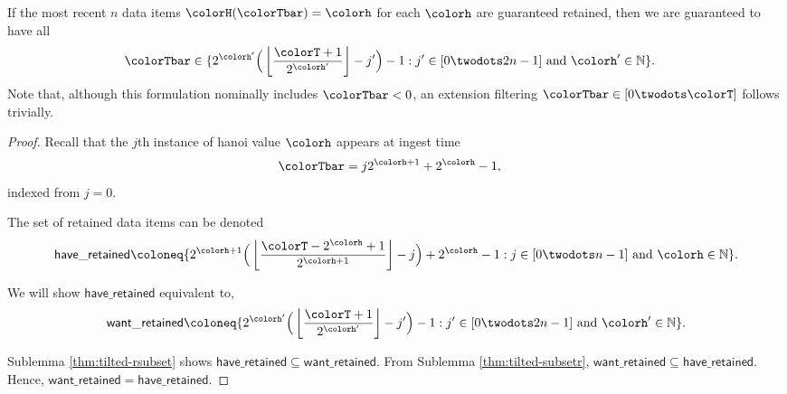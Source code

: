 \begin{lemma}
\label{thm:retained-equivalence-tilted}
If the most recent $n$ data items $\colorH(\colorTbar) = \colorh$ for each \hv{} $\colorh$ are guaranteed retained, then we are guaranteed to have all
\begin{align*}
\colorTbar
&\in
\{
  2^{\colorh'}\Big(\left\lfloor \frac{\colorT + 1}{2^{\colorh'}} \right\rfloor - j'\Big) - 1
  :
  j' \in [0 \twodots 2n - 1]
  \text{ and }
  \colorh' \in \mathbb{N}
\}.
\end{align*}
Note that, although this formulation nominally includes $\colorTbar < 0$, an extension filtering $\colorTbar \in [0 \twodots \colorT]$ follows trivially.
\end{lemma}
\begin{proof}

Recall that the $j$th instance of hanoi value $\colorh$ appears at ingest time
\begin{align*}
\colorTbar
&= j2^{\colorh + 1} + 2^{\colorh} - 1,
\end{align*}
indexed from $j=0$.

The set of retained data items can be denoted
\begin{align*}
\mathsf{have\_retained} \coloneq
\{
  2^{\colorh + 1}\Big( \left\lfloor\frac{\colorT - 2^{\colorh} + 1}{2^{\colorh + 1}} \right\rfloor - j\Big) + 2^{\colorh} - 1
  :
  j \in [0 \twodots n-1]
  \text{ and }
  \colorh \in \mathbb{N}
\}.
\end{align*}

We will show $\mathsf{have\_retained}$ equivalent to,
\begin{align*}
\mathsf{want\_retained} \coloneq
\{
  2^{\colorh'}\Big(\left\lfloor \frac{\colorT + 1}{2^{\colorh'}} \right\rfloor - j'\Big) - 1
  :
  j' \in [0 \twodots 2n-1]
  \text{ and }
  \colorh' \in \mathbb{N}
\}.
\end{align*}

Sublemma \ref{thm:tilted-rsubset} shows $\mathsf{have\_retained} \subseteq \mathsf{want\_retained}$.
From Sublemma \ref{thm:tilted-subsetr}, $\mathsf{want\_retained} \subseteq \mathsf{have\_retained}$.
Hence, $\mathsf{want\_retained} = \mathsf{have\_retained}$.

\end{proof}

